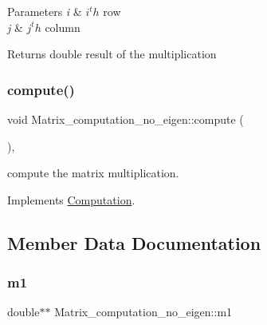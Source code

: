 \begin{DoxyParams}{Parameters}
{\em i} & $ i^th $ row \\
\hline
{\em j} & $ j^th $ column \\
\hline
\end{DoxyParams}
\begin{DoxyReturn}{Returns}
double result of the multiplication 
\end{DoxyReturn}
\mbox{\label{classMatrix__computation__no__eigen_a7fbc5e6986b2f630e8356e4d276aa03e}} 
\subsubsection{\texorpdfstring{compute()}{compute()}\hspace{0.1cm}{\footnotesize\ttfamily [2/2]}}
{\footnotesize\ttfamily void Matrix\+\_\+computation\+\_\+no\+\_\+eigen\+::compute (\begin{DoxyParamCaption}{ }\end{DoxyParamCaption})\hspace{0.3cm}{\ttfamily [inline]}, {\ttfamily [virtual]}}



compute the matrix multiplication. 



Implements \hyperlink{classComputation_a1b2d101b74dadde0624f837a62c051c6}{Computation}.



\subsection{Member Data Documentation}
\mbox{\label{classMatrix__computation__no__eigen_a66d9dde3f7fc191c8be8b23a1c7764e2}} 
\subsubsection{\texorpdfstring{m1}{m1}}
{\footnotesize\ttfamily double$\ast$$\ast$ Matrix\+\_\+computation\+\_\+no\+\_\+eigen\+::m1\hspace{0.3cm}{\ttfamily [private]}}



